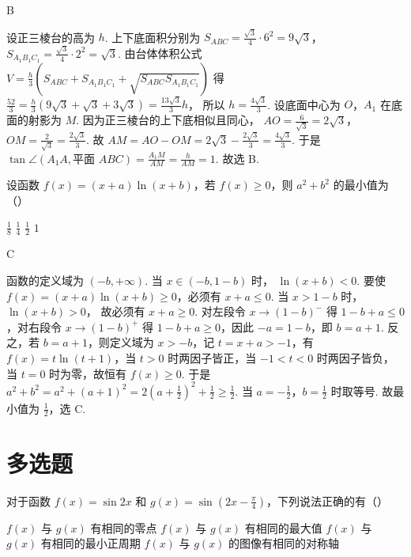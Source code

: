 \begin{answer}
B
\end{answer}

\begin{solution}
设正三棱台的高为 \(h\). 上下底面积分别为
\(S_{ABC}=\frac{\sqrt3}{4}\cdot 6^2=9\sqrt3\)，\(S_{A_1B_1C_1}=\frac{\sqrt3}{4}\cdot 2^2=\sqrt3\).
由台体体积公式
\(V=\frac{h}{3}\left(S_{ABC}+S_{A_1B_1C_1}+\sqrt{S_{ABC}S_{A_1B_1C_1}}\right)\)
得
\(\frac{52}{3}=\frac{h}{3}(9\sqrt3+\sqrt3+3\sqrt3)=\frac{13\sqrt3}{3}h\)，
所以
\(h=\frac{4\sqrt3}{3}\).
设底面中心为 \(O\)，\(A_1\) 在底面的射影为 \(M\). 因为正三棱台的上下底相似且同心，
\(AO=\frac{6}{\sqrt3}=2\sqrt3\)，\(OM=\frac{2}{\sqrt3}=\frac{2\sqrt3}{3}\).
故
\(AM=AO-OM=2\sqrt3-\frac{2\sqrt3}{3}=\frac{4\sqrt3}{3}\).
于是
\(\tan\angle(A_1A,\text{平面 }ABC)=\frac{A_1M}{AM}=\frac{h}{AM}=1\).
故选 B.
\end{solution}

\begin{problem}
设函数 \(f(x)=(x+a)\ln(x+b)\)，若 \(f(x)\ge 0\)，则 \(a^2+b^2\) 的最小值为（\quad）

\choices
    {\(\frac18\)}
    {\(\frac14\)}
    {\(\frac12\)}
    {\(1\)}
\end{problem}

\begin{answer}
C
\end{answer}

\begin{solution}
函数的定义域为 \((-b,+\infty)\).
当 \(x\in(-b,1-b)\) 时，
\(\ln(x+b)<0\).
要使 \(f(x)=(x+a)\ln(x+b)\ge 0\)，必须有
\(x+a\le 0\).
当 \(x>1-b\) 时，
\(\ln(x+b)>0\)，
故必须有
\(x+a\ge 0\).
对左段令 \(x\to(1-b)^{-}\) 得 \(1-b+a\le 0\)，对右段令 \(x\to(1-b)^{+}\) 得 \(1-b+a\ge 0\)，因此 \(-a=1-b\)，即 \(b=a+1\).
反之，若 \(b=a+1\)，则定义域为 \(x>-b\)，记 \(t=x+a>-1\)，有 \(f(x)=t\ln(t+1)\)，当 \(t>0\) 时两因子皆正，当 \(-1<t<0\) 时两因子皆负，当 \(t=0\) 时为零，故恒有 \(f(x)\ge 0\).
于是
\(a^2+b^2=a^2+(a+1)^2=2\left(a+\frac12\right)^2+\frac12\ge \frac12\).
当 \(a=-\frac12\)，\(b=\frac12\) 时取等号.
故最小值为 \(\frac12\)，选 C.
\end{solution}
\section{多选题}

\begin{problem}
对于函数 \(f(x)=\sin 2x\) 和 \(g(x)=\sin\left(2x-\frac{\pi}{4}\right)\)，下列说法正确的有（\quad）

\choices
    {\(f(x)\) 与 \(g(x)\) 有相同的零点}
    {\(f(x)\) 与 \(g(x)\) 有相同的最大值}
    {\(f(x)\) 与 \(g(x)\) 有相同的最小正周期}
    {\(f(x)\) 与 \(g(x)\) 的图像有相同的对称轴}
\end{problem}

